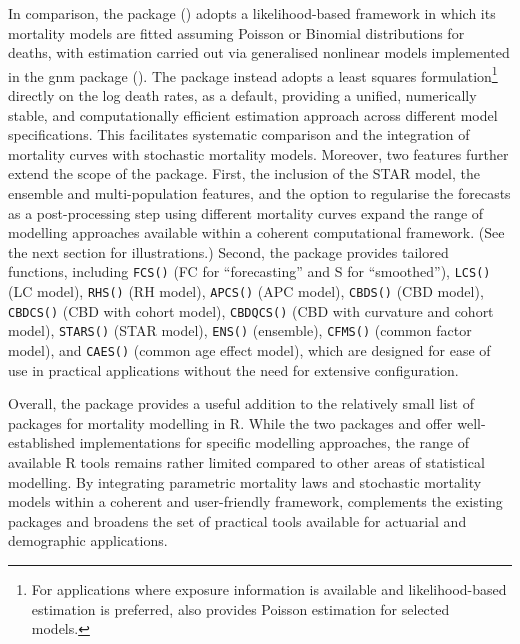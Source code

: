 In comparison, the  package (\citet{Villegas2025}) adopts a likelihood-based framework in which its mortality models are fitted assuming Poisson or Binomial distributions for deaths, with estimation carried out via generalised nonlinear models implemented in the gnm package (\citet{Turner2025}). The  package instead adopts a least squares formulation\footnote{For applications where exposure information is available and likelihood-based estimation is preferred,  also provides Poisson estimation for selected models.} directly on the log death rates, as a default, providing a unified, numerically stable, and computationally efficient estimation approach across different model specifications. This facilitates systematic comparison and the integration of mortality curves with stochastic mortality models. Moreover, two features further extend the scope of the  package. First, the inclusion of the STAR model, the ensemble and multi-population features, and the option to regularise the forecasts as a post-processing step using different mortality curves expand the range of modelling approaches available within a coherent computational framework. (See the next section for illustrations.) Second, the  package provides tailored functions, including \texttt{FCS()} (FC for ``forecasting'' and S for ``smoothed''), \texttt{LCS()} (LC model), \texttt{RHS()} (RH model), \texttt{APCS()} (APC model), \texttt{CBDS()} (CBD model), \texttt{CBDCS()} (CBD with cohort model), \texttt{CBDQCS()} (CBD with curvature and cohort model), \texttt{STARS()} (STAR model), \texttt{ENS()} (ensemble), \texttt{CFMS()} (common factor model), and \texttt{CAES()} (common age effect model), which are designed for ease of use in practical applications without the need for extensive configuration.

Overall, the  package provides a useful addition to the relatively small list of packages for mortality modelling in R. While the two packages  and  offer well-established implementations for specific modelling approaches, the range of available R tools remains rather limited compared to other areas of statistical modelling. By integrating parametric mortality laws and stochastic mortality models within a coherent and user-friendly framework,  complements the existing packages and broadens the set of practical tools available for actuarial and demographic applications.

